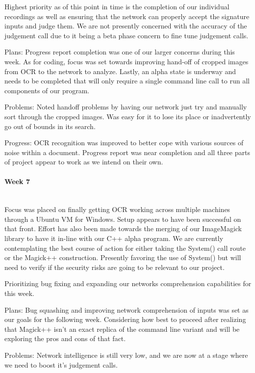 \documentclass[article, onecolumn, draftclsnofoot,10pt, compsoc]{IEEEtran}
\begin{document}
Highest priority as of this point in time is the completion of our individual recordings as well as ensuring that the network can properly accept the signature inputs and judge them. We are not presently concerned with the accuracy of the judgement call due to it being a beta phase concern to fine tune judgement calls.
 
Plans:
Progress report completion was one of our larger concerns during this week. As for coding, focus was set towards improving hand-off of cropped images from OCR to the network to analyze. Lastly, an alpha state is underway and needs to be completed that will only require a single command line call to run all components of our program.
 
Problems:
Noted handoff problems by having our network just try and manually sort through the cropped images. Was easy for it to lose its place or inadvertently go out of bounds in its search.
 
Progress:
OCR recognition was improved to better cope with various sources of noise within a document. Progress report was near completion and all three parts of project appear to work as we intend on their own.

\paragraph{Week 7}
\mbox{}\\
Focus was placed on finally getting OCR working across multiple machines through a Ubuntu VM for Windows. Setup appears to have been successful on that front. Effort has also been made towards the merging of our ImageMagick library to have it in-line with our C++ alpha program. We are currently contemplating the best course of action for either taking the System() call route or the Magick++ construction. Presently favoring the use of System() but will need to verify if the security risks are going to be relevant to our project.
 
Prioritizing bug fixing and expanding our networks comprehension capabilities for this week.
 
Plans:
Bug squashing and improving network comprehension of inputs was set as our goals for the following week. Considering how best to proceed after realizing that Magick++ isn't an exact replica of the command line variant and will be exploring the pros and cons of that fact.
 
Problems:
Network intelligence is still very low, and we are now at a stage where we need to boost it's judgement calls.
 
\end{document}
